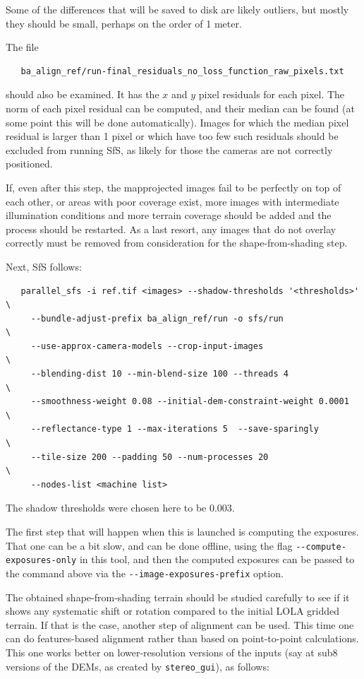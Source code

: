 Some of the differences that will be saved to disk are likely outliers,
but mostly they should be small, perhaps on the order of 1 meter.

The file 
\begin{verbatim}
   ba_align_ref/run-final_residuals_no_loss_function_raw_pixels.txt
\end{verbatim}

should also be examined. It has the $x$ and $y$ pixel residuals for each pixel.
The norm of each pixel residual can be computed, and their median 
can be found (at some point this will be done automatically). Images
for which the median pixel residual is larger than 1 pixel or which 
have too few such residuals should be excluded from running SfS,
as likely for those the cameras are not correctly positioned. 

If, even after this step, the mapprojected images fail to be perfectly
on top of each other, or areas with poor coverage exist, more images
with intermediate illumination conditions and more terrain coverage
should be added and the process should be restarted. As a last resort,
any images that do not overlay correctly must be removed from
consideration for the shape-from-shading step.

Next, SfS follows:

\begin{verbatim}
   parallel_sfs -i ref.tif <images> --shadow-thresholds '<thresholds>'  \
     --bundle-adjust-prefix ba_align_ref/run -o sfs/run                 \ 
     --use-approx-camera-models --crop-input-images                     \
     --blending-dist 10 --min-blend-size 100 --threads 4                \
     --smoothness-weight 0.08 --initial-dem-constraint-weight 0.0001    \
     --reflectance-type 1 --max-iterations 5  --save-sparingly          \
     --tile-size 200 --padding 50 --num-processes 20                    \
     --nodes-list <machine list>
\end{verbatim}

The shadow thresholds were chosen here to be 0.003.

The first step that will happen when this is launched is computing the
exposures. That one can be a bit slow, and can be done offline, using
the flag \texttt{-\/-compute-exposures-only} in this tool, and then the
computed exposures can be passed to the command above via the
\texttt{-\/-image-exposures-prefix} option.

The obtained shape-from-shading terrain should be studied carefully to
see if it shows any systematic shift or rotation compared to the initial
LOLA gridded terrain. If that is the case, another step of alignment can
be used. This time one can do features-based alignment rather than based
on point-to-point calculations. This one works better on
lower-resolution versions of the inputs (say at sub8 versions of the
DEMs, as created by \texttt{stereo\_gui}), as follows:

